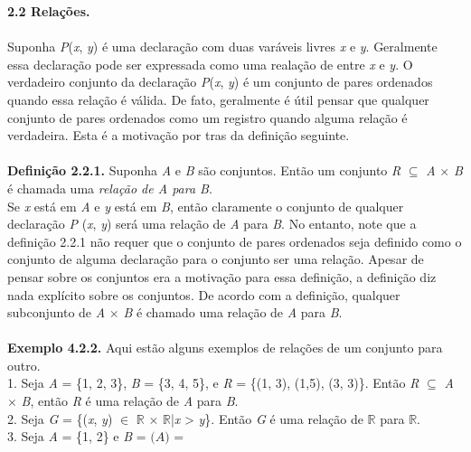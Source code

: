 {\textbf{\large 2.2 Relações.}}
\\
\\

Suponha \textit{P}(\textit{x}, \textit{y}) é uma declaração com duas varáveis livres \textit{x} e \textit{y}. Geralmente essa
declaração pode ser expressada como uma realação de entre \textit{x} e \textit{y}. O verdadeiro conjunto da declaração
\textit{P}(\textit{x}, \textit{y}) é um conjunto de pares ordenados quando essa relação é válida. De fato, geralmente é útil 
pensar que qualquer conjunto de pares ordenados como um registro quando alguma relação é verdadeira. Esta é a motivação por tras
da definição seguinte.
\\
\\

\textbf{Definição 2.2.1.} Suponha \textit{A} e \textit{B} são conjuntos. Então um conjunto \textit{R} $\subseteq$ \textit{A} 
$\times$ \textit{B} é chamada uma \textit{relação de A para B}.
\\
Se \textit{x} está em \textit{A} e \textit{y} está em \textit{B}, então claramente o conjunto de qualquer declaração \textit{P}
(\textit{x}, \textit{y}) será uma relação de \textit{A} para \textit{B}. No entanto, note que a definição 2.2.1 não requer que 
o conjunto de pares ordenados seja definido como o conjunto de alguma declaração para o conjunto ser uma relação. Apesar de pensar
sobre os conjuntos era a motivação para essa definição, a definição diz nada explícito sobre os conjuntos. De acordo com a definição,
qualquer subconjunto de \textit{A} $\times$ \textit{B} é chamado uma relação de \textit{A} para \textit{B}.
\\
\\

\textbf{Exemplo 4.2.2.} Aqui estão alguns exemplos de relações de um conjunto para outro.
\\
1. Seja \textit{A} = \{1, 2, 3\}, \textit{B} = \{3, 4, 5\}, e \textit{R} = \{(1, 3), (1,5), (3, 3)\}. Então \textit{R} $\subseteq$ 
\textit{A} $\times$ \textit{B}, então \textit{R} é uma relação de \textit{A} para \textit{B}.
\\
2. Seja \textit{G} = \{(\textit{x}, \textit{y}) $\in$ $\mathbb{R}$ $\times$ $\mathbb{R}$|\textit{x} > \textit{y}\}. Então \textit{G}
é uma relação de $\mathbb{R}$ para $\mathbb{R}$.
\\
3. Seja \textit{A} = \{1, 2\} e \textit{B} = $\mathcal(A)$ = 

